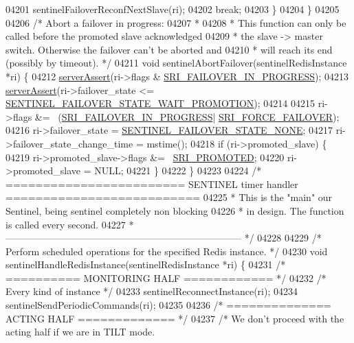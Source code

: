 \begin{DoxyCode}
{{{{{{{{{{{{{{{{{{{{{{{{{{{{{{{{{{{{{{{{{{{{{{{{{{{{{{{{{{{{{{{{{{{{{{{{{{{{{{{{{{{{{{{{{{{{{{{{{{{{{{04201             sentinelFailoverReconfNextSlave(ri);
04202             \textcolor{keywordflow}{break};
04203     \}
04204 \}
04205 
04206 \textcolor{comment}{/* Abort a failover in progress:}
04207 \textcolor{comment}{ *}
04208 \textcolor{comment}{ * This function can only be called before the promoted slave acknowledged}
04209 \textcolor{comment}{ * the slave -> master switch. Otherwise the failover can't be aborted and}
04210 \textcolor{comment}{ * will reach its end (possibly by timeout). */}
04211 \textcolor{keywordtype}{void} sentinelAbortFailover(sentinelRedisInstance *ri) \{
04212     \hyperlink{server_8h_a88114b5169b4c382df6b56506285e56a}{serverAssert}(ri->flags & \hyperlink{sentinel_8c_a0546b63633196f09fcd90957243b0798}{SRI\_FAILOVER\_IN\_PROGRESS});
04213     \hyperlink{server_8h_a88114b5169b4c382df6b56506285e56a}{serverAssert}(ri->failover\_state <= 
      \hyperlink{sentinel_8c_a49d9c64c03e76dcbf7728ad64dd99330}{SENTINEL\_FAILOVER\_STATE\_WAIT\_PROMOTION});
04214 
04215     ri->flags &= ~(\hyperlink{sentinel_8c_a0546b63633196f09fcd90957243b0798}{SRI\_FAILOVER\_IN\_PROGRESS}|
      \hyperlink{sentinel_8c_a9b13a255852e8097e4730cb495cdfd94}{SRI\_FORCE\_FAILOVER});
04216     ri->failover\_state = \hyperlink{sentinel_8c_a23bad5aa23e7b1a930ad4aa535938efb}{SENTINEL\_FAILOVER\_STATE\_NONE};
04217     ri->failover\_state\_change\_time = mstime();
04218     \textcolor{keywordflow}{if} (ri->promoted\_slave) \{
04219         ri->promoted\_slave->flags &= ~\hyperlink{sentinel_8c_a6c6c019b1af48a9c0e9507422051c684}{SRI\_PROMOTED};
04220         ri->promoted\_slave = NULL;
04221     \}
04222 \}
04223 
04224 \textcolor{comment}{/* ======================== SENTINEL timer handler ==========================}
04225 \textcolor{comment}{ * This is the "main" our Sentinel, being sentinel completely non blocking}
04226 \textcolor{comment}{ * in design. The function is called every second.}
04227 \textcolor{comment}{ * -------------------------------------------------------------------------- */}
04228 
04229 \textcolor{comment}{/* Perform scheduled operations for the specified Redis instance. */}
04230 \textcolor{keywordtype}{void} sentinelHandleRedisInstance(sentinelRedisInstance *ri) \{
04231     \textcolor{comment}{/* ========== MONITORING HALF ============ */}
04232     \textcolor{comment}{/* Every kind of instance */}
04233     sentinelReconnectInstance(ri);
04234     sentinelSendPeriodicCommands(ri);
04235 
04236     \textcolor{comment}{/* ============== ACTING HALF ============= */}
04237     \textcolor{comment}{/* We don't proceed with the acting half if we are in TILT mode.}
}}}}}}}}}}}}}}}}}}}}}}}}}}}}}}}}}}}}}}}}}}}}}}}}}}}}}}}}}}}}}}}}}}}}}}}}}}}}}}}}}}}}}}}}}}}}}}}}}}}}}}
\end{DoxyCode}
